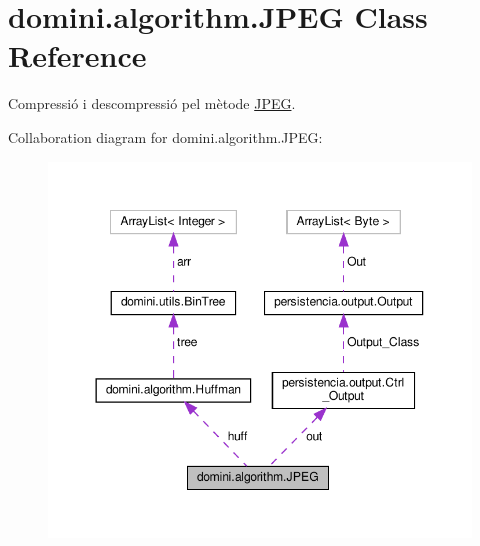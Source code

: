 \hypertarget{classdomini_1_1algorithm_1_1JPEG}{}\section{domini.\+algorithm.\+J\+P\+EG Class Reference}
\label{classdomini_1_1algorithm_1_1JPEG}


Compressió i descompressió pel mètode \hyperlink{classdomini_1_1algorithm_1_1JPEG}{J\+P\+EG}.  




Collaboration diagram for domini.\+algorithm.\+J\+P\+EG\+:\nopagebreak
\begin{figure}[H]
\begin{center}
\leavevmode
\includegraphics[width=350pt]{classdomini_1_1algorithm_1_1JPEG__coll__graph}
\end{center}
\end{figure}
